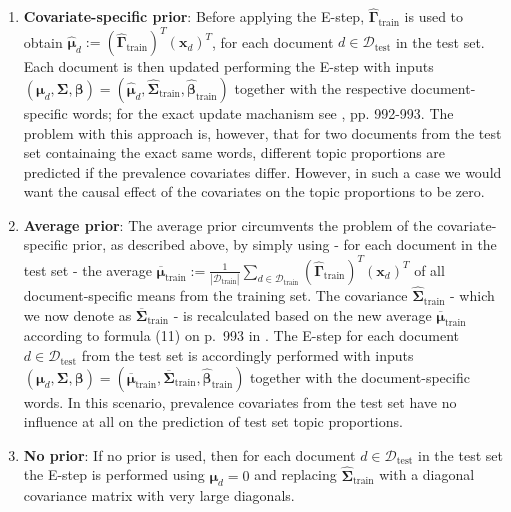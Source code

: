 \begin{enumerate}
\item \textbf{Covariate-specific prior}: Before applying the E-step, $\hat{\boldsymbol{\Gamma}}_{\text{train}}$ is used to obtain $\hat{\boldsymbol{\mu}}_d := (\hat{\boldsymbol{\Gamma}}_{\text{train}})^T(\boldsymbol{x}_d)^T$, for each document $d \in \mathcal{D}_{\text{test}}$ in the test set. Each document is then updated performing the E-step with inputs $(\boldsymbol{\mu}_d, \boldsymbol{\Sigma}, \boldsymbol{\beta}) = (\hat{\boldsymbol{\mu}}_d, \hat{\boldsymbol{\Sigma}}_{\text{train}}, \hat{\boldsymbol{\beta}}_{\text{train}})$ together with the respective document-specific words; for the exact update machanism see \cite{roberts2013structural}, pp. 992-993. The problem with this approach is, however, that for two documents from the test set containaing the exact same words, different topic proportions are predicted if the prevalence covariates differ. However, in such a case we would want the causal effect of the covariates on the topic proportions to be zero.
\item \textbf{Average prior}: The average prior circumvents the problem of the covariate-specific prior, as described above, by simply using - for each document in the test set - the average $\overline{\boldsymbol{\mu}}_{\text{train}} := \frac{1}{|\mathcal{D}_{\text{train}}|}\sum_{d \in \mathcal{D}_{\text{train}}} (\hat{\boldsymbol{\Gamma}}_{\text{train}})^T(\boldsymbol{x}_d)^T$ of all document-specific means from the training set. The covariance $\hat{\boldsymbol{\Sigma}}_{\text{train}}$ - which we now denote as $\overline{\boldsymbol{\Sigma}}_{\text{train}}$ - is recalculated based on the new average $\overline{\boldsymbol{\mu}}_{\text{train}}$ according to formula (11) on p.\ 993 in \cite{roberts2013structural}. The E-step for each document $d \in \mathcal{D}_{\text{test}}$ from the test set is accordingly performed with inputs $(\boldsymbol{\mu}_d, \boldsymbol{\Sigma}, \boldsymbol{\beta}) = (\overline{\boldsymbol{\mu}}_{\text{train}}, \overline{\boldsymbol{\Sigma}}_{\text{train}}, \hat{\boldsymbol{\beta}}_{\text{train}})$ together with the document-specific words. In this scenario, prevalence covariates from the test set have no influence at all on the prediction of test set topic proportions. 
\item \textbf{No prior}: If no prior is used, then for each document $d \in \mathcal{D}_{\text{test}}$ in the test set the E-step is performed using $\boldsymbol{\mu}_d=0$ and replacing $\hat{\boldsymbol{\Sigma}}_{\text{train}}$ with a diagonal covariance matrix with very large diagonals.
\end{enumerate}
